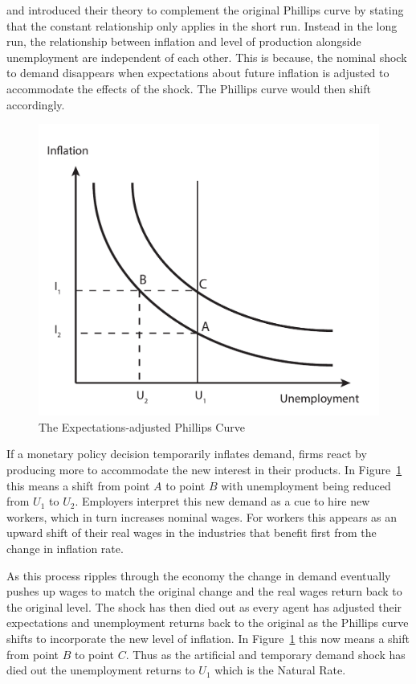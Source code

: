 \documentclass[12pt,a4paper,english]{article}
\begin{document}
\cite{friedman1968} and \cite{phelps1967} introduced their theory to complement the original Phillips curve by stating that the constant relationship only applies in the short run. Instead in the long run, the relationship between inflation and level of production alongside unemployment are independent of each other. This is because, the nominal shock to demand disappears when expectations about future inflation is adjusted to accommodate the effects of the shock. The Phillips curve would then shift accordingly.


\begin{figure}[h!]
\vspace{1.5cm}
	\centering
	\includegraphics[width=0.75\linewidth]{Graphs/Phillips_curve_2}
	\caption{The Expectations-adjusted Phillips Curve}
	\label{fig:phillipscurve2}
\vspace{1.5cm}
\end{figure}


If a monetary policy decision temporarily inflates demand, firms react by producing more to accommodate the new interest in their products. In Figure~\ref{fig:phillipscurve2} this means a shift from point $A$ to point $B$ with unemployment being reduced from $U_1$ to $U_2$. Employers interpret this new demand as a cue to hire new workers, which in turn increases nominal wages. For workers this appears as an upward shift of their real wages in the industries that benefit first from the change in inflation rate.

As this process ripples through the economy the change in demand eventually pushes up wages to match the original change and the real wages return back to the original level. The shock has then died out as every agent has adjusted their expectations and unemployment returns back to the original as the Phillips curve shifts to incorporate the new level of inflation. In Figure~\ref{fig:phillipscurve2} this now means a shift from point $B$ to point $C$. Thus as the artificial and temporary demand shock has died out the unemployment returns to $U_1$ which is the Natural Rate.
\end{document}
